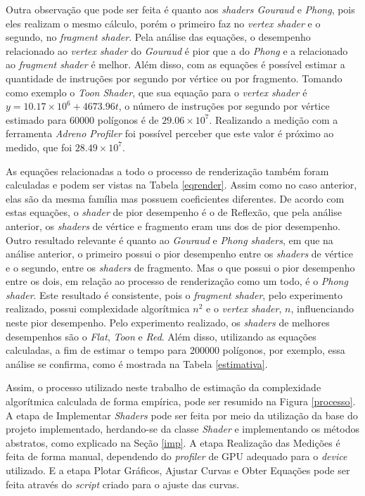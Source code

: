 	Outra observação que pode ser feita é quanto aos \textit{shaders Gouraud} e \textit{Phong}, pois eles realizam o mesmo cálculo, porém o primeiro faz no \textit{vertex shader} e o segundo, no \textit{fragment shader}. Pela análise das equações, o desempenho relacionado ao \textit{vertex shader} do \textit{Gouraud} é pior que a do \textit{Phong} e a relacionado ao \textit{fragment shader} é melhor.  Além disso, com as equações é possível estimar a quantidade de instruções por segundo por vértice ou por fragmento. Tomando como exemplo o \textit{Toon Shader}, que sua equação para o \textit{vertex shader} é  $y = 10.17 \times 10^6 + 4673.96t$, o número de instruções por segundo por vértice estimado para 60000 polígonos é de $29.06 \times 10^7$. Realizando a medição com a ferramenta \textit{Adreno Profiler} foi possível perceber que este valor é próximo ao medido, que foi $28.49 \times 10^7$.

	As equações relacionadas a todo o processo de renderização também foram calculadas e podem ser vistas na Tabela \ref{eqrender}. Assim como no caso anterior, elas são da mesma família mas possuem coeficientes diferentes. De acordo com estas equações, o \textit{shader} de pior desempenho é o de Reflexão, que pela análise anterior, os \textit{shaders} de vértice e fragmento eram uns dos de pior desempenho. Outro resultado relevante é quanto ao \textit{Gouraud} e \textit{Phong shaders}, em que na análise anterior, o primeiro possui o pior desempenho entre os \textit{shaders} de vértice e o segundo, entre os \textit{shaders} de fragmento.  Mas o que possui o pior desempenho entre os dois, em relação ao processo de renderização como um todo, é o \textit{Phong shader}. Este resultado é consistente, pois o \textit{fragment shader}, pelo experimento realizado, possui complexidade algorítmica $n^2$ e o \textit{vertex shader}, $n$, influenciando neste pior desempenho. 	Pelo experimento realizado, os \textit{shaders} de melhores desempenhos são o \textit{Flat}, \textit{Toon} e \textit{Red}. Além disso, utilizando as equações calculadas, a fim de estimar o tempo para 200000 polígonos, por exemplo, essa análise se confirma, como é mostrada na Tabela \ref{estimativa}.
	
	Assim, o processo utilizado neste trabalho de estimação da complexidade algorítmica calculada de forma empírica, pode ser resumido na Figura \ref{processo}. A etapa de Implementar \textit{Shaders} pode ser feita por meio da utilização da base do projeto implementado, herdando-se da classe \textit{Shader} e implementando os métodos abstratos, como explicado na Seção \ref{imp}. A etapa Realização das Medições é feita de forma manual, dependendo do \textit{profiler} de GPU adequado para o \textit{device} utilizado. E a etapa Plotar Gráficos, Ajustar Curvas e Obter Equações pode ser feita através do \textit{script} criado para o ajuste das curvas.

